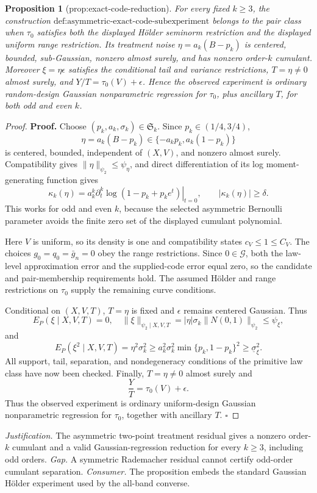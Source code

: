 \documentclass{article}
\newtheorem{proposition}{Proposition}
\begin{document}
\begin{proposition}[prop:exact-code-reduction]\label{prop:exact-code-reduction}
For every fixed \(k\ge3\), the construction \(\text{def:asymmetric-exact-code-subexperiment}\) belongs to the pair class when \(\tau_0\) satisfies both the displayed H\"older seminorm restriction and the displayed uniform range restriction. Its treatment noise \(\eta=a_k(B-p_k)\) is centered, bounded, sub-Gaussian, nonzero almost surely, and has nonzero order-\(k\) cumulant. Moreover \(\xi=\eta\epsilon\) satisfies the conditional tail and variance restrictions, \(T=\eta\ne0\) almost surely, and \(Y/T=\tau_0(V)+\epsilon\). Hence the observed experiment is ordinary random-design Gaussian nonparametric regression for \(\tau_0\), plus ancillary \(T\), for both odd and even \(k\).
\end{proposition}
\begin{proof}
\textbf{Proof.}
Choose \((p_k,a_k,\sigma_k)\in\mathfrak S_k\).  Since \(p_k\in(1/4,3/4)\),
\[
 \eta=a_k(B-p_k)\in\{-a_kp_k,a_k(1-p_k)\}
\]
is centered, bounded, independent of \((X,V)\), and nonzero almost surely.  Compatibility gives \(\|\eta\|_{\psi_2}\le\psi_\eta\), and direct differentiation of its log moment-generating function gives
\[
 \kappa_k(\eta)=a_k^k\left.\partial_t^k\log(1-p_k+p_ke^t)\right|_{t=0},
 \qquad |\kappa_k(\eta)|\ge\delta. \tag{1}
\]
This works for odd and even \(k\), because the selected asymmetric Bernoulli parameter avoids the finite zero set of the displayed cumulant polynomial.

Here \(V\) is uniform, so its density is one and compatibility states \(c_V\le1\le C_V\).  The choices \(g_0=q_0=\bar g_n=0\) obey the range restrictions.  Since \(0\in\mathcal G\), both the law-level approximation error and the supplied-code error equal zero, so the candidate and pair-membership requirements hold.  The assumed H\"older and range restrictions on \(\tau_0\) supply the remaining curve conditions.

Conditional on \((X,V,T)\), \(T=\eta\) is fixed and \(\epsilon\) remains centered Gaussian.  Thus
\[
 E_P(\xi\mid X,V,T)=0,
 \quad
 \|\xi\|_{\psi_2\mid X,V,T}
 =|\eta|\sigma_k\|N(0,1)\|_{\psi_2}
 \le\psi_\xi, \tag{2}
\]
and
\[
 E_P(\xi^2\mid X,V,T)=\eta^2\sigma_k^2
 \ge a_k^2\sigma_k^2\min\{p_k,1-p_k\}^2
 \ge\underline\sigma_\xi^2. \tag{3}
\]
All support, tail, separation, and nondegeneracy conditions of the primitive law class have now been checked.  Finally, \(T=\eta\ne0\) almost surely and
\[
 \frac{Y}{T}=\tau_0(V)+\epsilon. \tag{4}
\]
Thus the observed experiment is ordinary uniform-design Gaussian nonparametric regression for \(\tau_0\), together with ancillary \(T\). \(\square\)
\end{proof}
\par\smallskip\noindent \textit{Justification.} The asymmetric two-point treatment residual gives a nonzero order-\(k\) cumulant and a valid Gaussian-regression reduction for every \(k\ge3\), including odd orders. \textit{Gap.} A symmetric Rademacher residual cannot certify odd-order cumulant separation. \textit{Consumer.} The proposition embeds the standard Gaussian Hölder experiment used by the all-band converse.
\end{document}
